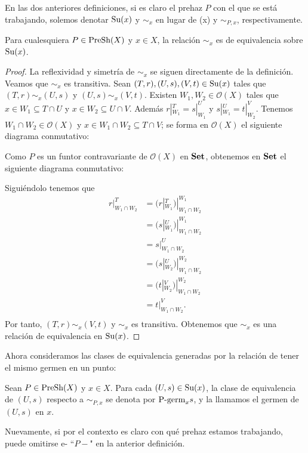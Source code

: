 En las dos anteriores definiciones, si es claro el prehaz $P$ con el que se está trabajando, solemos denotar $\normalfont{\text{Su}}(x)$ y $\sim_{x}$ en lugar de \PSu(x) y $\sim_{P,x}$, respectivamente.
\begin{Prop}
   Para cualesquiera $P\in\normalfont{\text{PreSh}}(X)$ y $x\in X$, la relación $\sim_{x}$ es de equivalencia sobre $\normalfont{\text{Su}}(x)$.
\end{Prop}
\begin{proof}
   La reflexividad y simetría de $\sim_{x}$ se siguen directamente de la definición. Veamos que $\sim_{x}$ es transitiva. Sean $(T,r),(U,s),(V,t)\in\normalfont{\text{Su}}(x)$ tales que $(T,r)\sim_{x}(U,s)$ y $(U,s)\sim_{x}(V,t)$. Existen $W_1,W_2\in\mathcal{O}(X)$ tales que $x\in W_1\subseteq T\cap U$ y $x\in W_2\subseteq U\cap V$. Además $r|^{T}_{W_1}=s|^{U}_{W_1}$ y $s|^{U}_{W_1}=t|^{V}_{W_2}$. Tenemos $W_1\cap W_2\in\mathcal{O}(X)$ y $x\in W_1\cap W_2\subseteq T\cap V$; se forma en $\mathcal{O}(X)$ el siguiente diagrama conmutativo:
   
   
   Como $P$ es un funtor contravariante de $\mathcal{O}(X)$ en $\normalfont{\textbf{Set}}$, obtenemos en $\normalfont{\textbf{Set}}$ el siguiente diagrama conmutativo:
   
   Siguiéndolo tenemos que
   $$
   \begin{aligned}
      r|^{T}_{W_1\cap W_2}&=(r|^{T}_{W_1})|^{W_1}_{W_1\cap W_2}\\
                          &=(s|^{U}_{W_1})|^{W_1}_{W_1\cap W_2}\\
                          &=s|^{U}_{W_1\cap W_2}\\
                          &=(s|^{U}_{W_2})|^{W_2}_{W_1\cap W_2}\\
                          &=(t|^{V}_{W_2})|^{W_2}_{W_1\cap W_2}\\
                          &=t|^{V}_{W_1\cap W_2}.\\
   \end{aligned}
   $$
   Por tanto, $(T,r)\sim_{x} (V,t)$ y $\sim_{x}$ es transitiva. Obtenemos que $\sim_{x}$ es una relación de equivalencia en $\normalfont{\text{Su}}(x)$.
\end{proof}
Ahora consideramos las clases de equivalencia generadas por la relación de tener el mismo germen en un punto:
\begin{Def}
   Sean $P\in \normalfont{\text{PreSh}}(X)$ y $x\in X$. Para cada $(U,s)\in \normalfont{\text{Su}}(x)$, la clase de equivalencia de $(U,s)$ respecto a $\sim_{P,x}$ se denota por $\normalfont{\text{P-germ}}_{x}s$, y la llamamos el germen de $(U,s)$ en $x$.
\end{Def}
Nuevamente, si por el contexto es claro con qué prehaz estamos trabajando, puede omitirse e- ``$P-$" en la anterior definición.

